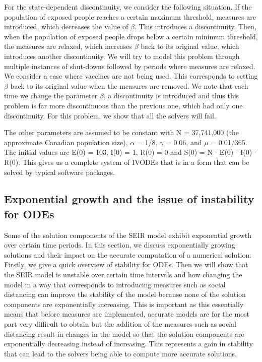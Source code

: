 For the state-dependent discontinuity, we consider the following situation. If the population of exposed people reaches a certain maximum threshold, measures are introduced, which decreases the value of $\beta$. This introduces a discontinuity. Then, when the population of exposed people drops below a certain minimum threshold, the measures are relaxed, which increases $\beta$ back to its original value, which introduces another discontinuity. We will try to model this problem through multiple instances of shut-downs followed by periods where measures are relaxed. We consider a case where vaccines are not being used. This corresponds to setting $\beta$ back to its original value when the measures are removed. We note that each time we change the parameter $\beta$, a discontinuity is introduced and thus this problem is far more discontinuous than the previous one, which had only one discontinuity. For this problem, we show that all the solvers will fail.

The other parameters are assumed to be constant with N = 37,741,000 (the approximate Canadian population size), $\alpha$ = 1/8, $\gamma$ = 0.06, and $\mu$ = 0.01/365. The initial values are E(0) = 103, I(0) = 1, R(0) = 0 and S(0) = N - E(0) - I(0) - R(0). This gives us a complete system of IVODEs that is in a form that can be solved by typical software packages.

\subsection{Exponential growth and the issue of instability for ODEs}
\label{subsection:exponential_growth}
Some of the solution components of the SEIR model exhibit exponential growth over certain time periods. In this section, we discuss exponentially growing solutions and their impact on the accurate computation of a numerical solution. Firstly, we give a quick overview of stability for ODEs. Then we will show that the SEIR model is unstable over certain time intervals and how changing the model in a way that corresponds to introducing measures such as social distancing can improve the stability of the model because none of the solution components are exponentially increasing. This is important as this essentially means that before measures are implemented, accurate models are for the most part very difficult to obtain but the addition of the measures such as social distancing result in changes in the model so that the solution components are exponentially decreasing instead of increasing. This represents a gain in stability that can lead to the solvers being able to compute more accurate solutions.

